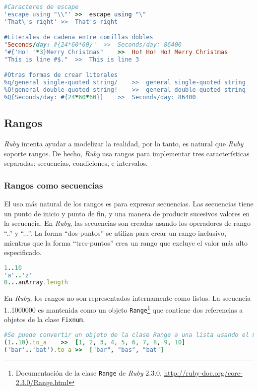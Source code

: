 \begin{lstlisting}[language=Ruby]
#Caracteres de escape
'escape using "\\"'	>>	escape using "\"
'That\'s right'	>>	That's right

#Literales de cadena entre comillas dobles
"Seconds/day: #{24*60*60}"	>>	Seconds/day: 86400
"#{'Ho! '*3}Merry Christmas"	>>	Ho! Ho! Ho! Merry Christmas
"This is line #$."	>>	This is line 3

#Otras formas de crear literales
%q/general single-quoted string/	>>	general single-quoted string
%Q!general double-quoted string!	>>	general double-quoted string
%Q{Seconds/day: #{24*60*60}}	>>	Seconds/day: 86400
\end{lstlisting}

\subsection{Rangos}
\textit{Ruby} intenta ayudar a modelizar la realidad, por lo tanto, es natural que \textit{Ruby} soporte rangos. De hecho, \textit{Ruby} usa rangos para implementar tres características separadas: secuencias, condiciones, e intervalos.

\subsubsection{Rangos como secuencias}
El uso más natural de los rangos es para expresar secuencias. Las secuencias tiene un punto de inicio y punto de fin, y una manera de producir sucesivos valores en la secuencia. En \textit{Ruby}, las secuencias son creadas usando los operadores de rango ``..'' y ``...''. La forma ``dos-puntos'' se utiliza para crear un rango inclusivo, mientras que la forma ``tres-puntos'' crea un rango que excluye el valor más alto especificado.

\begin{lstlisting}[language=Ruby]
1..10
'a'..'z'
0...anArray.length  
\end{lstlisting}  

En \textit{Ruby}, los rangos no son representados internamente como listas. La secuencia 1..1000000 es mantenida como un objeto \texttt{Range}\footnote{Documentación de la clase \texttt{Range} de \textit{Ruby} 2.3.0, \url{http://ruby-doc.org/core-2.3.0/Range.html}} que contiene dos referencias a objetos de la clase \texttt{Fixnum}.

\begin{lstlisting}[language=Ruby]
#Se puede convertir un objeto de la clase Range a una lista usando el metodo to_a.
(1..10).to_a	>>	[1, 2, 3, 4, 5, 6, 7, 8, 9, 10]
('bar'..'bat').to_a	>>	["bar", "bas", "bat"]
\end{lstlisting}

